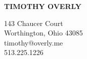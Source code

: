 \documentclass[11pt]{article}
\begin{document}
\titlepage
\begin{center}
\begin{huge}
\textbf{TIMOTHY OVERLY}\\
\end{huge}
143 Chaucer Court\\
Worthington, Ohio  43085\\
timothy@overly.me\\
513.225.1226\bigskip
\end{center}
\end{document}
